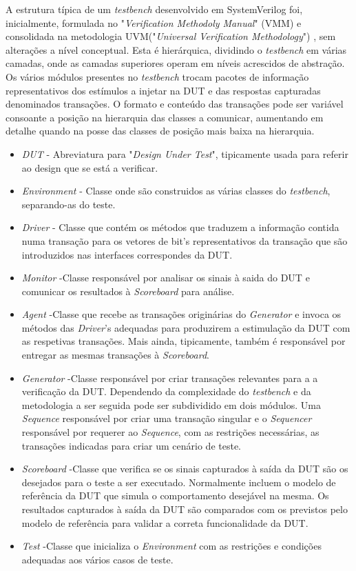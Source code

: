 A estrutura típica de um \textit{testbench} desenvolvido em SystemVerilog foi, inicialmente, formulada no "\textit{Verification Methodoly Manual}" (VMM) \cite{VMM} e consolidada na metodologia UVM("\textit{Universal Verification Methodology}") \cite{UVM}, sem alterações a nível conceptual. Esta é hierárquica, dividindo o \textit{testbench} em várias camadas, onde as camadas superiores operam em níveis acrescidos de abstração. Os vários módulos presentes no \textit{testbench} trocam pacotes de informação representativos dos estímulos a injetar na DUT e das respostas capturadas denominados transações. O formato e conteúdo das transações pode ser variável consoante a posição na hierarquia das classes a comunicar, aumentando em detalhe quando na posse das classes de posição mais baixa na hierarquia.

\begin{itemize}
  \item \textit{DUT}  - \quad Abreviatura para "\textit{Design Under Test}", tipicamente usada para referir ao design que se está a verificar.  
  \item \textit{Environment}  - \quad Classe onde são construidos as várias classes do \textit{testbench}, separando-as do teste. 
  \item \textit{Driver}  - \quad Classe que contém os métodos que traduzem a informação contida numa transação para os vetores de bit's representativos da transação que são introduzidos nas interfaces correspondes da DUT.
  \item \textit{Monitor} -\quad Classe responsável por analisar os sinais à saida do DUT e comunicar os resultados à \textit{Scoreboard} para análise.
  \item \textit{Agent} -\quad Classe que recebe as transações originárias do \textit{Generator} e invoca os métodos das \textit{Driver}'s adequadas para produzirem a estimulação da DUT com as respetivas transações. Mais ainda, tipicamente, também é responsável por entregar as mesmas transações à \textit{Scoreboard}.
  \item \textit{Generator} -\quad Classe responsável por criar transações relevantes para a a verificação da DUT. Dependendo da complexidade do \textit{testbench} e da metodologia a ser seguida pode ser subdividido em dois módulos. Uma \textit{Sequence} responsável por criar uma transação singular e o \textit{Sequencer} responsável por requerer ao \textit{Sequence}, com as restrições necessárias, as transações indicadas para criar um cenário de teste. 
  \item \textit{Scoreboard} -\quad Classe que verifica se os sinais capturados à saída da DUT são os desejados para o teste a ser executado. Normalmente incluem o modelo de referência da DUT que simula o comportamento desejável na mesma. Os resultados capturados à saída da DUT são comparados com os previstos pelo modelo de referência para validar a correta funcionalidade da DUT.
  \item \textit{Test} -\quad Classe que inicializa o \textit{Environment} com as restrições e condições adequadas aos vários casos de teste. 
\end{itemize}

